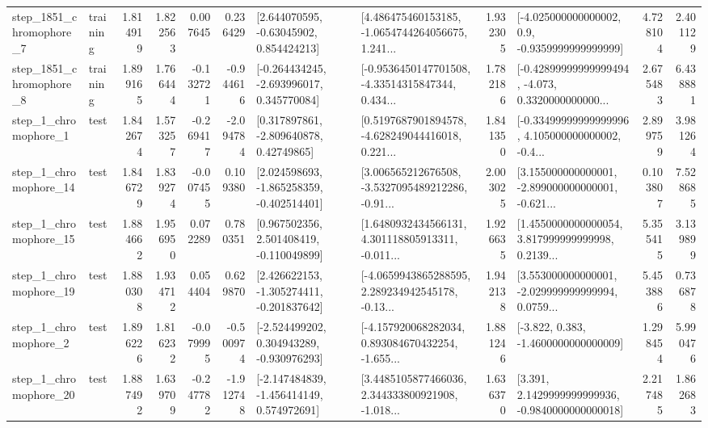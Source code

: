 \begin{tabular}{llrrrrllrlrr}
  step\_1851\_chromophore\_7 &  training &      1.814919 &    1.822563 &      0.007645 &  0.236429 &     [2.644070595, -0.63045902, 0.854424213] &  [4.486475460153185, -1.0654744264056675, 1.241... &       1.932305 &     [-4.025000000000002, 0.9, -0.9359999999999999] &            4.728104 &          2.401129 \\
  step\_1851\_chromophore\_8 &  training &      1.899165 &    1.766444 &     -0.132721 & -0.944616 &   [-0.264434245, -2.693996017, 0.345770084] &  [-0.9536450147701508, -4.33514315847344, 0.434... &       1.782186 &  [-0.42899999999999494, -4.073, 0.3320000000000... &            2.675483 &          6.438881 \\
     step\_1\_chromophore\_1 &      test &      1.842674 &    1.573257 &     -0.269417 & -2.094784 &     [0.317897861, -2.809640878, 0.42749865] &  [0.5197687901894578, -4.628249044416018, 0.221... &       1.841350 &  [-0.33499999999999996, 4.105000000000002, -0.4... &            2.899759 &          3.981264 \\
    step\_1\_chromophore\_14 &      test &      1.846729 &    1.839274 &     -0.007455 &  0.109380 &   [2.024598693, -1.865258359, -0.402514401] &  [3.006565212676508, -3.5327095489212286, -0.91... &       2.003025 &  [3.155000000000001, -2.899000000000001, -0.621... &            0.103807 &          7.528685 \\
    step\_1\_chromophore\_15 &      test &      1.884662 &    1.956950 &      0.072289 &  0.780351 &    [0.967502356, 2.501408419, -0.110049899] &  [1.6480932434566131, 4.301118805913311, -0.011... &       1.926635 &  [1.4550000000000054, 3.817999999999998, 0.2139... &            5.355415 &          3.139899 \\
    step\_1\_chromophore\_19 &      test &      1.880308 &    1.934712 &      0.054404 &  0.629870 &   [2.426622153, -1.305274411, -0.201837642] &  [-4.0659943865288595, 2.289234942545178, -0.13... &       1.942138 &  [3.553000000000001, -2.029999999999994, 0.0759... &            5.453886 &          0.736878 \\
     step\_1\_chromophore\_2 &      test &      1.896226 &    1.816232 &     -0.079995 & -0.500974 &   [-2.524499202, 0.304943289, -0.930976293] &  [-4.157920068282034, 0.893084670432254, -1.655... &       1.881246 &               [-3.822, 0.383, -1.4600000000000009] &            1.298454 &          5.990476 \\
    step\_1\_chromophore\_20 &      test &      1.887492 &    1.639709 &     -0.247782 & -1.912748 &   [-2.147484839, -1.456414149, 0.574972691] &  [3.4485105877466036, 2.344333800921908, -1.018... &       1.636370 &   [3.391, 2.1429999999999936, -0.9840000000000018] &            2.217485 &          1.862683 \\

\end{tabular}
